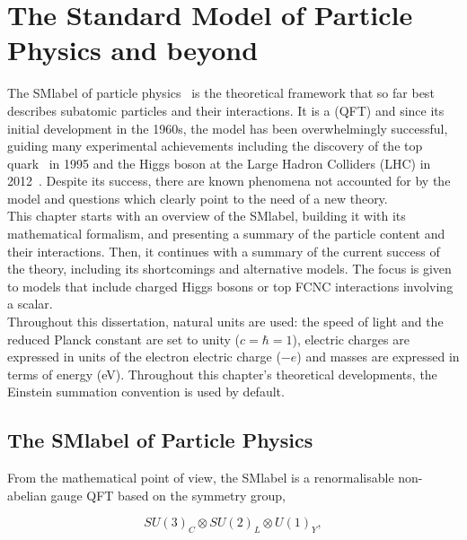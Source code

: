 \chapter{The Standard Model of Particle Physics and beyond}
\label{chapter:SM}

The \acrfull{SMlabel} of particle physics~\cite{PhysRevLett.19.1264,GLASHOW1961579,RevModPhys.52.525} is the theoretical framework
that so far best describes subatomic particles and their interactions.
It is a  (\acrshort{QFT}) and since its initial development in the 1960s,
the model has been overwhelmingly successful, guiding many experimental achievements
including the discovery of the top quark~\cite{topsearch1995,PhysRevLett.74.2626} in 1995
and the Higgs boson at the Large Hadron Colliders (LHC) in 2012~\cite{ATLASHiggs2012,CMShiggs2012}.
Despite its success, there are known phenomena not accounted for by the model
and questions which clearly point to the need of a new theory.\\

This chapter starts with an overview of the \acrshort{SMlabel}, building it with its mathematical formalism, and presenting a summary of the particle content and their interactions. Then, it continues with a summary of the current success of the theory, including its shortcomings and alternative models. The focus is given to models that include charged Higgs bosons or top FCNC interactions involving a scalar.\\

Throughout this dissertation, natural units are used: the speed of light and the reduced Planck constant are set to unity ($c=\hbar=1$),
electric charges are expressed in units of the electron electric charge ($-e$) and masses are expressed in terms of energy (eV). Throughout this chapter's theoretical developments, the Einstein summation convention is used by default.

\section{The \acrlong{SMlabel} of Particle Physics}

From the mathematical point of view, the \acrshort{SMlabel} is a renormalisable non-abelian gauge \acrshort{QFT} based on the
symmetry group, 

\begin{equation}
    \label{Theory_eq:SMgroup}
    SU(3)_C\otimes SU(2)_L\otimes U(1)_Y,
\end{equation}

